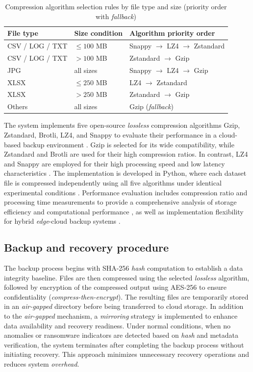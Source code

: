 \documentclass{iaesarticle}
\begin{document}
\begin{table}[H]
\centering
\fontsize{8pt}{10pt}\selectfont
\caption{Compression algorithm selection rules by file type and size (priority order with \textit{fallback})}
\label{tab:rule_selection}
\begin{tabular}{l l l}
\hline
\textbf{File type} & \textbf{Size condition} & \textbf{Algorithm priority order} \\
\hline
CSV / LOG / TXT & $\leq 100$ MB & Snappy $\rightarrow$ LZ4 $\rightarrow$ Zstandard \\
CSV / LOG / TXT & $> 100$ MB & Zstandard $\rightarrow$ Gzip \\
JPG & all sizes & Snappy $\rightarrow$ LZ4 $\rightarrow$ Gzip \\
XLSX & $\leq 250$ MB & LZ4 $\rightarrow$ Zstandard \\
XLSX & $> 250$ MB & Zstandard $\rightarrow$ Gzip \\
Others & all sizes & Gzip (\textit{fallback}) \\
\hline
\end{tabular}
\end{table}

The system implements five open-source \textit{lossless} compression algorithms Gzip, Zstandard, Brotli, LZ4, and Snappy to evaluate their performance in a cloud-based backup environment \cite{36}. Gzip is selected for its wide compatibility, while Zstandard and Brotli are used for their high compression ratios. In contrast, LZ4 and Snappy are employed for their high processing speed and low latency characteristics \cite{37}. The implementation is developed in Python, where each dataset file is compressed independently using all five algorithms under identical experimental conditions \cite{38}. Performance evaluation includes compression ratio and processing time measurements to provide a comprehensive analysis of storage efficiency and computational performance \cite{39}, as well as implementation flexibility for hybrid \textit{edge}-cloud backup systems \cite{22}.

\subsection{Backup and recovery procedure}
The backup process begins with SHA-256 \textit{hash} computation to establish a data integrity baseline. Files are then compressed using the selected \textit{lossless} algorithm, followed by encryption of the compressed output using AES-256 to ensure confidentiality (\textit{compress-then-encrypt}). The resulting files are temporarily stored in an \textit{air-gapped} directory before being transferred to cloud storage. In addition to the \textit{air-gapped} mechanism, a \textit{mirroring} strategy is implemented to enhance data availability and recovery readiness. Under normal conditions, when no anomalies or ransomware indicators are detected based on \textit{hash} and metadata verification, the system terminates after completing the backup process without initiating recovery. This approach minimizes unnecessary recovery operations and reduces system \textit{overhead}.
\end{document}
